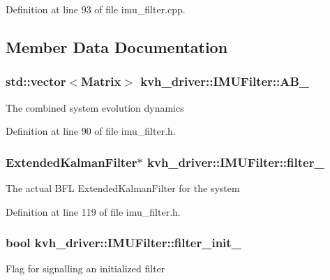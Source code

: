 \-Definition at line 93 of file imu\-\_\-filter.\-cpp.



\subsection{\-Member \-Data \-Documentation}
\subsubsection[{\-A\-B\-\_\-}]{\setlength{\rightskip}{0pt plus 5cm}std\-::vector$<$\-Matrix$>$ {\bf kvh\-\_\-driver\-::\-I\-M\-U\-Filter\-::\-A\-B\-\_\-}\hspace{0.3cm}{\ttfamily  [private]}}\label{classkvh__driver_1_1IMUFilter_a47f298cffece4e20fe0eced3e7410fda}
\-The combined system evolution dynamics 

\-Definition at line 90 of file imu\-\_\-filter.\-h.

\subsubsection[{filter\-\_\-}]{\setlength{\rightskip}{0pt plus 5cm}\-Extended\-Kalman\-Filter$\ast$ {\bf kvh\-\_\-driver\-::\-I\-M\-U\-Filter\-::filter\-\_\-}\hspace{0.3cm}{\ttfamily  [private]}}\label{classkvh__driver_1_1IMUFilter_a3c522c49f5761dec1144b2a77e686d3a}
\-The actual \-B\-F\-L \-Extended\-Kalman\-Filter for the system 

\-Definition at line 119 of file imu\-\_\-filter.\-h.

\subsubsection[{filter\-\_\-init\-\_\-}]{\setlength{\rightskip}{0pt plus 5cm}bool {\bf kvh\-\_\-driver\-::\-I\-M\-U\-Filter\-::filter\-\_\-init\-\_\-}\hspace{0.3cm}{\ttfamily  [private]}}\label{classkvh__driver_1_1IMUFilter_af8e1eaff2bb879410b1b67badee08e75}
\-Flag for signalling an initialized filter 

